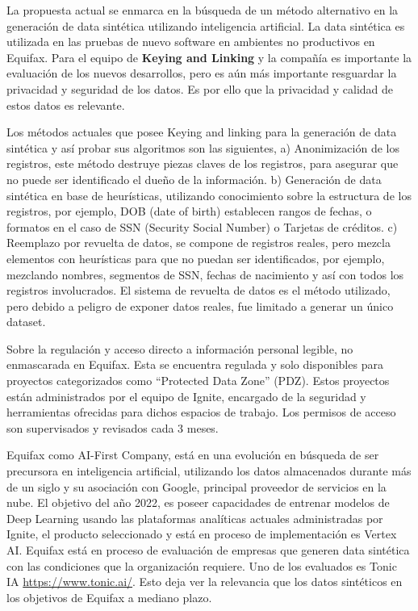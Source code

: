 La propuesta actual se enmarca en la búsqueda de un método alternativo en la generación de data sintética utilizando inteligencia artificial. La data sintética es utilizada en las pruebas de nuevo software en ambientes no productivos en Equifax. Para el equipo de \textbf{Keying and Linking} y la compañía es importante la evaluación de los nuevos desarrollos, pero es aún más importante resguardar la privacidad y seguridad de los datos. Es por ello que la privacidad y calidad de estos datos es relevante.

Los métodos actuales que posee Keying and linking para la generación de data sintética y así probar sus algoritmos son las siguientes, a) Anonimización de los registros, este método destruye piezas claves de los registros, para asegurar que no puede ser identificado el dueño de la información. b) Generación de data sintética en base de heurísticas, utilizando conocimiento sobre la estructura de los registros, por ejemplo, DOB (date of birth) establecen rangos de fechas, o formatos en el caso de SSN (Security Social Number) o Tarjetas de créditos. c) Reemplazo por revuelta de datos, se compone de registros reales, pero mezcla elementos con heurísticas para que no puedan ser identificados, por ejemplo, mezclando nombres, segmentos de SSN, fechas de nacimiento y así con todos los registros involucrados. El sistema de revuelta de datos es el método utilizado, pero debido a peligro de exponer datos reales, fue limitado a generar un único dataset. 

Sobre la regulación y acceso directo a información personal legible, no enmascarada en Equifax. Esta se encuentra regulada y solo disponibles para proyectos categorizados como “Protected Data Zone” (PDZ). Estos proyectos están administrados por el equipo de Ignite, encargado de la seguridad y herramientas ofrecidas para dichos espacios de trabajo. Los permisos de acceso son supervisados y revisados cada 3 meses.

Equifax como AI-First Company, está en una evolución en búsqueda de ser precursora en inteligencia artificial, utilizando los datos almacenados durante más de un siglo y su asociación con Google, principal proveedor de servicios en la nube. El objetivo del año 2022, es poseer capacidades de entrenar modelos de Deep Learning usando las plataformas analíticas actuales administradas por Ignite, el producto seleccionado y está en proceso de implementación es Vertex AI. Equifax está en proceso de evaluación de empresas que generen data sintética con las condiciones que la organización requiere. Uno de los evaluados es Tonic IA \url{https://www.tonic.ai/}. Esto deja ver la relevancia que los datos sintéticos en los objetivos de Equifax a mediano plazo.

